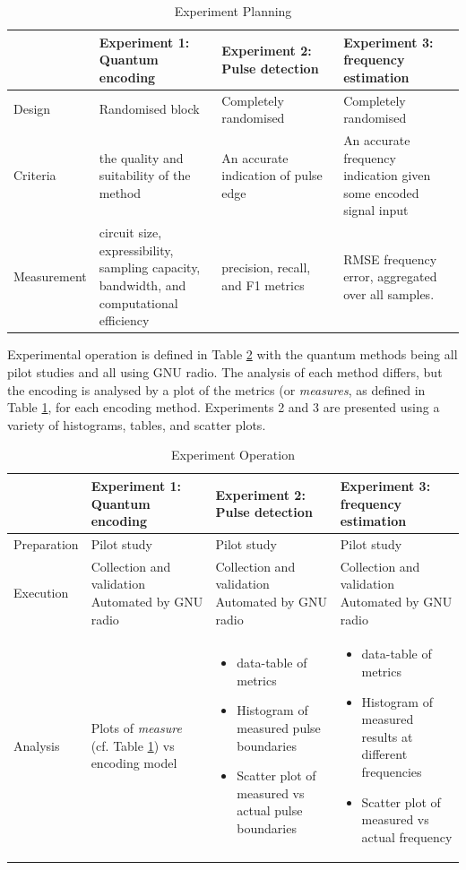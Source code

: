 \begin{table}[ht]
\caption{Experiment Planning}
\label{tab:exp_planning}
\begin{tabular}{p{0.16\linewidth}|p{0.28\linewidth}p{0.28\linewidth}p{0.28\linewidth}}
\hline
& Experiment 1: Quantum encoding & Experiment 2: Pulse detection & Experiment 3: frequency estimation \\
\hline
Design & Randomised block & Completely randomised & Completely randomised \\
Criteria & the quality and suitability of the method & An accurate  indication of pulse edge & An accurate frequency indication given some encoded signal input \\
Measurement & circuit size, expressibility, sampling capacity, bandwidth, and  computational efficiency & precision, recall, and F1 metrics & \ac{RMSE} frequency error, aggregated over all samples. \\
\hline
\end{tabular}
\end{table}

Experimental operation is defined in Table \ref{tab:exp_operation} with the quantum methods being all pilot studies and all using GNU radio.
The analysis of each method differs, but the encoding is analysed by a plot of the metrics (or \textit{measures}, as defined in Table \ref{tab:exp_planning}, for each encoding method.
Experiments 2 and 3 are presented using a variety of histograms, tables, and scatter plots.

\begin{table}[ht]
\caption{Experiment Operation}
\label{tab:exp_operation}
\begin{tabular}{p{0.16\linewidth}|p{0.28\linewidth}p{0.28\linewidth}p{0.28\linewidth}}
\hline
& Experiment 1: Quantum encoding & Experiment 2: Pulse detection & Experiment 3: frequency estimation \\
\hline
Preparation & Pilot study & Pilot study & Pilot study \\
Execution & Collection and validation Automated by GNU radio & Collection and validation Automated by GNU radio & Collection and validation Automated by GNU radio \\
Analysis & Plots of \textit{measure} (cf. Table \ref{tab:exp_planning}) vs encoding model &
\begin{itemize}
    \item data-table of metrics
    \item Histogram of measured pulse boundaries
    \item Scatter plot of measured vs actual pulse boundaries
\end{itemize}
&
\begin{itemize}
    \item data-table of metrics
    \item Histogram of measured results at different frequencies
    \item Scatter plot of measured vs actual frequency
\end{itemize}\\
\hline
\end{tabular}
\end{table}

